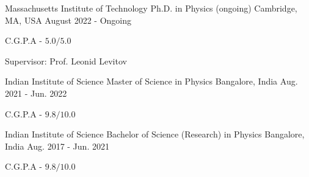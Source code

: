 

\begin{cventries}

    \cventry
	{Massachusetts Institute of Technology} %
	{Ph.D. in Physics (ongoing)} %
	{Cambridge, MA, USA} %
	{August 2022 - Ongoing} %
	{
	\begin{cvitems} %
		\item {C.G.P.A - $5.0/5.0$} \\
	\end{cvitems}
	Supervisor: Prof. Leonid Levitov
	}

    \cventry
	{Indian Institute of Science} %
	{Master of Science in Physics} %
	{Bangalore, India} %
	{Aug. 2021 - Jun. 2022} %
	{
	\begin{cvitems} %
		\item {C.G.P.A - $9.8/10.0$}
	\end{cvitems}
	}

  \cventry
    {Indian Institute of Science} %
    {Bachelor of Science (Research) in Physics} %
    {Bangalore, India} %
    {Aug. 2017 - Jun. 2021} %
    {
      \begin{cvitems} %
        \item {C.G.P.A - $9.8/10.0$}
      \end{cvitems}
    }




\end{cventries}
